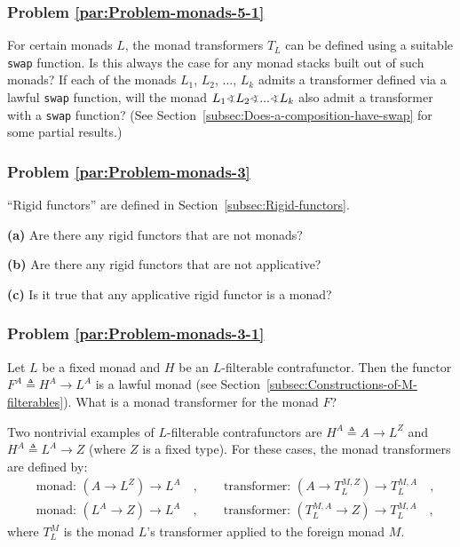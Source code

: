 \subsubsection{Problem \label{par:Problem-monads-5-1}\ref{par:Problem-monads-5-1}}

For certain monads $L$, the monad transformers $T_{L}$ can be defined
using a suitable \lstinline!swap! function. Is this always the case
for any monad stacks built out of such monads? If each of the monads
$L_{1}$, $L_{2}$, ..., $L_{k}$ admits a transformer defined via
a lawful \lstinline!swap! function, will the monad $L_{1}\varangle L_{2}\varangle...\varangle L_{k}$
also admit a transformer with a \lstinline!swap! function? (See Section~\ref{subsec:Does-a-composition-have-swap}
for some partial results.)

\subsubsection{Problem \label{par:Problem-monads-3}\ref{par:Problem-monads-3}}

\textsf{``}Rigid functors\textsf{''} are defined
in Section~\ref{subsec:Rigid-functors}.

\textbf{(a)} Are there any rigid functors that are not monads? 

\textbf{(b)} Are there any rigid functors that are not applicative?

\textbf{(c)} Is it true that any applicative rigid functor is a monad?

\subsubsection{Problem \label{par:Problem-monads-3-1}\ref{par:Problem-monads-3-1}}

Let $L$ be a fixed monad and $H$ be an $L$-filterable contrafunctor.
Then the functor $F^{A}\triangleq H^{A}\rightarrow L^{A}$ is a lawful
monad (see Section~\ref{subsec:Constructions-of-M-filterables}).
What is a monad transformer for the monad $F$? 

Two nontrivial examples of $L$-filterable contrafunctors are $H^{A}\triangleq A\rightarrow L^{Z}$
and $H^{A}\triangleq L^{A}\rightarrow Z$ (where $Z$ is a fixed type).
For these cases, the monad transformers are defined by:
\begin{align*}
 & \text{monad: }(A\rightarrow L^{Z})\rightarrow L^{A}\quad,\quad\quad\text{transformer: }(A\rightarrow T_{L}^{M,Z})\rightarrow T_{L}^{M,A}\quad,\\
 & \text{monad: }(L^{A}\rightarrow Z)\rightarrow L^{A}\quad,\quad\quad\text{transformer: }(T_{L}^{M,A}\rightarrow Z)\rightarrow T_{L}^{M,A}\quad,
\end{align*}
where $T_{L}^{M}$ is the monad $L$\textsf{'}s transformer applied to the
foreign monad $M$.


